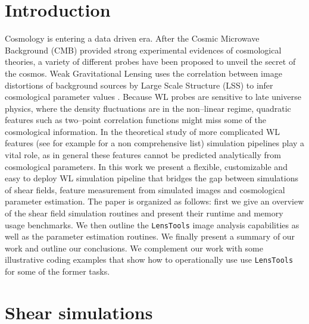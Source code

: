 \documentclass[reprint,aps,prd,superscriptaddress,showkeys,showpacs]{revtex4-1}
\newcommand{\LT}{\texttt{LensTools} }
\begin{document}
\section{Introduction}
%
Cosmology is entering a data driven era. After the Cosmic Microwave Background (CMB) \citep{WMAP,PlanckXVI2013} provided strong experimental evidences of cosmological theories, a variety of different probes have been proposed to unveil the secret of the cosmos. Weak Gravitational Lensing uses the correlation between image distortions of background sources by Large Scale Structure (LSS) to infer cosmological parameter values \citep{WLprimer}. Because WL probes are sensitive to late universe physics, where the density fluctuations are in the non--linear regime, quadratic features such as two--point correlation functions might miss some of the cosmological information. In the theoretical study of more complicated WL features (see for example \citep{3pcf1,bispectrum1,moments1,peaks1} for a non comprehensive list) simulation pipelines play a vital role, as in general these features cannot be predicted analytically from cosmological parameters. In this work we present a flexible, customizable and easy to deploy WL simulation pipeline that bridges the gap between simulations of shear fields, feature measurement from simulated images and cosmological parameter estimation. The paper is organized as follows: first we give an overview of the shear field simulation routines and present their runtime and memory usage benchmarks. We then outline the \LT image analysis capabilities as well as the parameter estimation routines. We finally present a summary of our work and outline our conclusions. We complement our work with some illustrative coding examples that show how to operationally use use \LT for some of the former tasks.


\section{Shear simulations} 
\label{shearsim}
\end{document}
